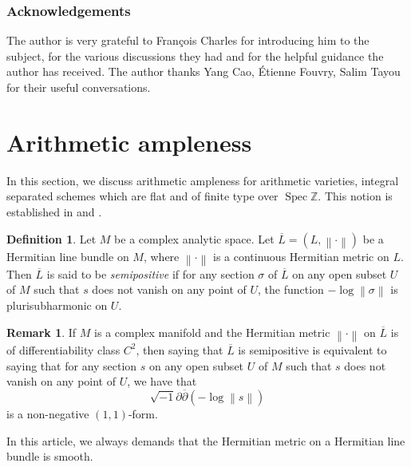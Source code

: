 \documentclass[JEP,XML,SOM,Unicode,published]{cedram}
\theoremstyle{plain}
\theoremstyle{definition}
\newtheorem*{defi}{Definition}
\newtheorem*{rmq}{Remark}
\newcommand{\Z}{\mathbb{Z}}
\DeclareMathOperator{\Spec}{Spec}
\begin{document}
\subsubsection*{Acknowledgements}
The author is very grateful to François Charles for introducing him to the subject, for the various discussions they had and for the helpful guidance the author has received. The author thanks Yang Cao, Étienne Fouvry, Salim Tayou for their useful conversations.

\section{Arithmetic ampleness}\label{arithample}

In this section, we discuss arithmetic ampleness for arithmetic varieties, \ie integral separated schemes which are flat and of finite type over $\Spec \Z$. This notion is established in \cite{Zh92} and \cite{Zh95}.

\begin{defi}
Let $M$ be a complex analytic space. Let $\overline{L}=(L,\left\lVert \cdot \right\rVert)$ be a Hermitian line bundle on $M$, where $\left\lVert \cdot \right\rVert$ is a continuous Hermitian metric on $L$. Then $\overline{L}$ is said to be \emph{semipositive} if for any section $\sigma$ of $\overline{L}$ on any open subset $U$ of $M$ such that $s$ does not vanish on any point of $U$, the function $-\log \left\lVert \sigma \right\rVert$ is plurisubharmonic on $U$.
\end{defi}
\begin{rmq}
If $M$ is a complex manifold and the Hermitian metric $\left\lVert \cdot \right\rVert$ on $\overline{L}$ is of differentiability class $C^2$, then saying that $\overline{L}$ is semipositive is equivalent to saying that for any section $s$ on any open subset $U$ of $M$ such that $s$ does not vanish on any point of $U$, we have that
\[
\sqrt{-1}\partial \overline{\partial}\left(-\log \left\lVert s \right\rVert\right)
\]
is a non-negative $(1,1)$-form.
\end{rmq}
In this article, we always demands that the Hermitian metric on a Hermitian line bundle is smooth.
\end{document}
